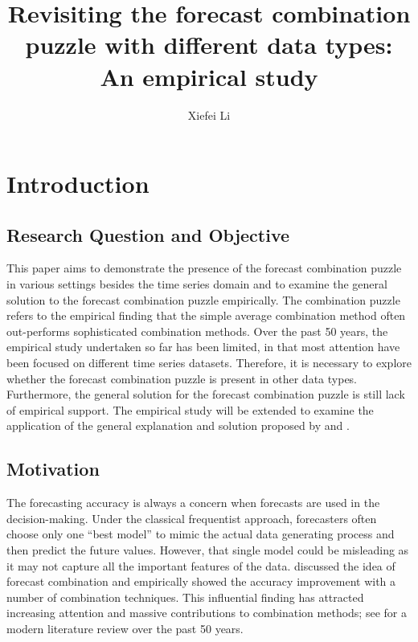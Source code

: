 \documentclass{monashthesis}
\author{Xiefei Li}
\title{Revisiting the forecast combination puzzle with different data types: An empirical study}
\begin{document}

\titlepage

{\sf\tighttoc\doublespacing}

\clearpage{}\setcounter{page}{0}

\hypertarget{ch:intro}{%
\chapter{Introduction}\label{ch:intro}}

\hypertarget{research-question-and-objective}{%
\section{Research Question and Objective}\label{research-question-and-objective}}

This paper aims to demonstrate the presence of the forecast combination puzzle in various settings besides the time series domain and to examine the general solution to the forecast combination puzzle empirically. The combination puzzle refers to the empirical finding that the simple average combination method often out-performs sophisticated combination methods. Over the past 50 years, the empirical study undertaken so far has been limited, in that most attention have been focused on different time series datasets. Therefore, it is necessary to explore whether the forecast combination puzzle is present in other data types. Furthermore, the general solution for the forecast combination puzzle is still lack of empirical support. The empirical study will be extended to examine the application of the general explanation and solution proposed by \textcite{ZMFP22} and \textcite{FZMP23}.

\hypertarget{motivation}{%
\section{Motivation}\label{motivation}}

The forecasting accuracy is always a concern when forecasts are used in the decision-making. Under the classical frequentist approach, forecasters often choose only one ``best model'' to mimic the actual data generating process and then predict the future values. However, that single model could be misleading as it may not capture all the important features of the data. \textcite{BG69} discussed the idea of forecast combination and empirically showed the accuracy improvement with a number of combination techniques. This influential finding has attracted increasing attention and massive contributions to combination methods; see \textcite{WHLK22} for a modern literature review over the past 50 years.
\end{document}
